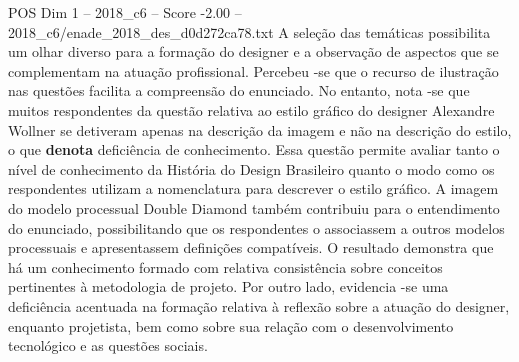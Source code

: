 \begin{textsample}{POS Dim 1 – 2018\_c6 – Score -2.00 – 2018\_c6/enade\_2018\_des\_d0d272ca78.txt}
A seleção das temáticas possibilita um olhar diverso para a formação do designer e a observação de aspectos que se complementam na atuação profissional.
Percebeu -se que o recurso de ilustração nas questões facilita a compreensão do enunciado.
No entanto, nota -se que muitos respondentes da questão relativa ao estilo gráfico do designer Alexandre Wollner se detiveram apenas na descrição da imagem e não na descrição do estilo, o que \textbf{denota} deficiência de conhecimento.
Essa questão permite avaliar tanto o nível de conhecimento da História do Design Brasileiro quanto o modo como os respondentes utilizam a nomenclatura para descrever o estilo gráfico.
A imagem do modelo processual Double Diamond também contribuiu para o entendimento do enunciado, possibilitando que os respondentes o associassem a outros modelos processuais e apresentassem definições compatíveis.
O resultado demonstra que há um conhecimento formado com relativa consistência sobre conceitos pertinentes à metodologia de projeto.
Por outro lado, evidencia -se uma deficiência acentuada na formação relativa à reflexão sobre a atuação do designer, enquanto projetista, bem como sobre sua relação com o desenvolvimento tecnológico e as questões sociais.

\end{textsample}
